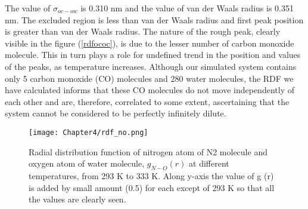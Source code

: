 \begin{table}[H]
\centering
\caption[RDF analysis between oxygen atoms of CO molecule.]
{ Simulated data for the RDF analysis between oxygen atoms of CO molecule at different temperatures, from 293 K to 333 K. } 
\label{rdfococtable}
\end{table}

The value of $\sigma_{oc-ow}$ is 0.310 nm and the value of van der Waals radius is 0.351 nm.
The excluded region is less than van der Waals radius and first peak position is greater than van der Waals radius. The nature of the rough peak, clearly visible in the figure (\ref{rdfococ}), is due to the lesser number of carbon monoxide molecule. This in turn plays a role for undefined trend in the position and values of the peaks, as temperature increases. Although our simulated system contains only 5 carbon
monoxide (CO) molecules and 280 water molecules, the RDF we have calculated informs that these CO molecules do not move independently of each other and are, therefore, correlated to some extent, ascertaining that the system cannot be considered to be perfectly infinitely dilute.

\begin{figure}[h!]
\centering
\texttt{[image: Chapter4/rdf\_no.png]}
\caption[Radial distribution function  of nitrogen atom of N2 molecule and oxygen atom of water molecule at different temperatures.]{ Radial distribution function  of nitrogen atom of N2 molecule and oxygen atom of water molecule, $g_{N-O} (r)$ at different temperatures, from 293 K to 333 K. Along y-axis the value of g (r) is added by small amount (0.5) for each  except of  293 K  so that all the values are clearly seen.}
\label{rdfno}
\end{figure}

